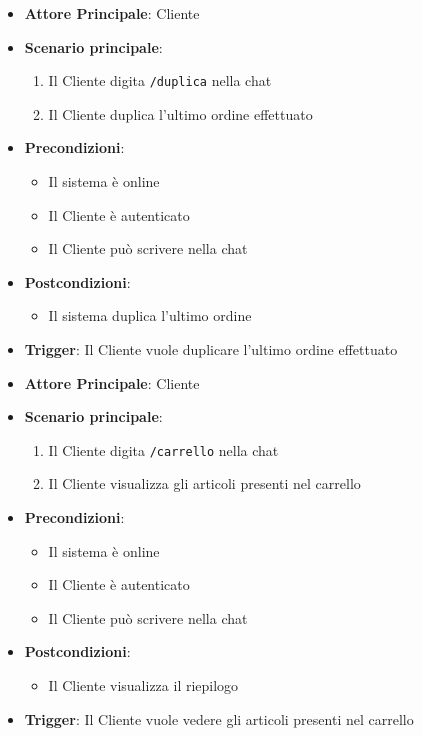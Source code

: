 \label{uc_44.1}
\begin{itemize}
    \item \textbf{Attore Principale}: Cliente
	\item \textbf{Scenario principale}:
	\begin{enumerate}
		\item Il Cliente digita \texttt{/duplica} nella chat
		\item Il Cliente duplica l'ultimo ordine effettuato
	\end{enumerate}
	\item \textbf{Precondizioni}:
	\begin{itemize}
		\item Il sistema è online
		\item Il Cliente è autenticato
		\item Il Cliente può scrivere nella chat
	\end{itemize}
	\item \textbf{Postcondizioni}:
	\begin{itemize}
		\item Il sistema duplica l'ultimo ordine
	\end{itemize}
	\item \textbf{Trigger}: Il Cliente vuole duplicare l'ultimo ordine effettuato
\end{itemize}

\label{uc_44.2}
\begin{itemize}
    \item \textbf{Attore Principale}: Cliente
	\item \textbf{Scenario principale}:
	\begin{enumerate}
		\item Il Cliente digita \texttt{/carrello} nella chat
		\item Il Cliente visualizza gli articoli presenti nel carrello
	\end{enumerate}
	\item \textbf{Precondizioni}:
	\begin{itemize}
		\item Il sistema è online 
		\item Il Cliente è autenticato
		\item Il Cliente può scrivere nella chat
	\end{itemize}
	\item \textbf{Postcondizioni}:
	\begin{itemize}
		\item Il Cliente visualizza il riepilogo
	\end{itemize}
	\item \textbf{Trigger}: Il Cliente vuole vedere gli articoli presenti nel carrello
\end{itemize}

